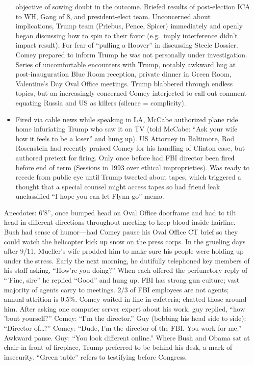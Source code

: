 \documentclass[
]{article}
\begin{document}
\begin{itemize}
  objective of sowing doubt in the outcome. Briefed results of
  post-election ICA to WH, Gang of 8, and president-elect team.
  Unconcerned about implications, Trump team (Priebus, Pence, Spicer)
  immediately and openly began discussing how to spin to their favor
  (e.g.~imply interference didn't impact result). For fear of ``pulling
  a Hoover'' in discussing Steele Dossier, Comey prepared to inform
  Trump he was not personally under investigation. Series of
  uncomfortable encounters with Trump, notably awkward hug at
  post-inauguration Blue Room reception, private dinner in Green Room,
  Valentine's Day Oval Office meetings. Trump blabbered through endless
  topics, but an increasingly concerned Comey interjected to call out
  comment equating Russia and US as killers (silence = complicity).
\item
  Fired via cable news while speaking in LA, McCabe authorized plane
  ride home infuriating Trump who saw it on TV (told McCabe: ``Ask your
  wife how it feels to be a loser'' and hung up). US Attorney in
  Baltimore, Rod Rosenstein had recently praised Comey for his handling
  of Clinton case, but authored pretext for firing. Only once before had
  FBI director been fired before end of term (Sessions in 1993 over
  ethical improprieties). Was ready to recede from public eye until
  Trump tweeted about tapes, which triggered a thought that a special
  counsel might access tapes so had friend leak unclassified ``I hope
  you can let Flynn go'' memo.
\end{itemize}

Anecdotes: 6'8'', once bumped head on Oval Office doorframe and had to
tilt head in different directions throughout meeting to keep blood
inside hairline. Bush had sense of humor---had Comey pause his Oval
Office CT brief so they could watch the helicopter kick up snow on the
press corps. In the grueling days after 9/11, Mueller's wife prodded him
to make sure his people were holding up under the stress. Early the next
morning, he dutifully telephoned key members of his staff asking,
``How're you doing?'' When each offered the perfunctory reply of
``'Fine, sire'' he replied ``Good'' and hung up. FBI has strong gun
culture; vast majority of agents carry to meetings. 2/3 of FBI employees
are not agents; annual attrition is 0.5\%. Comey waited in line in
cafeteria; chatted those around him. After asking one computer server
expert about his work, guy replied, ``how 'bout yourself?'' Comey: ``I'm
the director.'' Guy (bobbing his head side to side): ``Director
of\ldots?'' Comey: ``Dude, I'm the director of the FBI. You work for
me.'' Awkward pause. Guy: ``You look different online.'' Where Bush and
Obama sat at chair in front of fireplace, Trump preferred to be behind
his desk, a mark of insecurity. ``Green table'' refers to testifying
before Congress.
\end{document}
